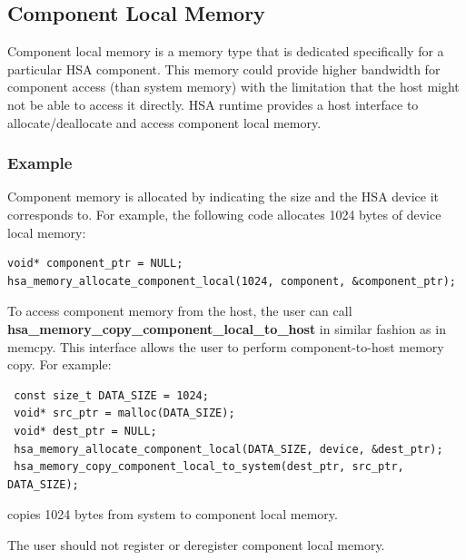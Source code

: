 \documentclass[draft]{book}
\newcommand{\reffun}[1]{\textbf{#1}}
\begin{document}


\hypertarget{device-memory}{}\subsection{Component Local Memory}
\label{device-memory}

Component local memory is a memory type that is dedicated specifically for a
particular HSA component. This memory could provide higher bandwidth for
component access (than system memory) with the limitation that the host might
not be able to access it directly. HSA runtime provides a host interface to
allocate/deallocate and access component local memory.



\hypertarget{device-memory-usage}{}\subsubsection{Example}\label{device-memory-usage}

Component memory is allocated by indicating the size and the HSA device it
corresponds to. For example, the following code allocates 1024 bytes of device
local memory:

\begin{lstlisting}
void* component_ptr = NULL;
hsa_memory_allocate_component_local(1024, component, &component_ptr);
\end{lstlisting}

To access component memory from the host, the user can call
\reffun{hsa_memory_copy_component_local_to_host} in similar fashion as in
memcpy. This interface allows the user to perform component-to-host memory
copy. For example:

\begin{lstlisting}
 const size_t DATA_SIZE = 1024;
 void* src_ptr = malloc(DATA_SIZE);
 void* dest_ptr = NULL;
 hsa_memory_allocate_component_local(DATA_SIZE, device, &dest_ptr);
 hsa_memory_copy_component_local_to_system(dest_ptr, src_ptr, DATA_SIZE);
\end{lstlisting}

copies 1024 bytes from system to component local memory.

The user should not register or deregister component local memory.
\end{document}
